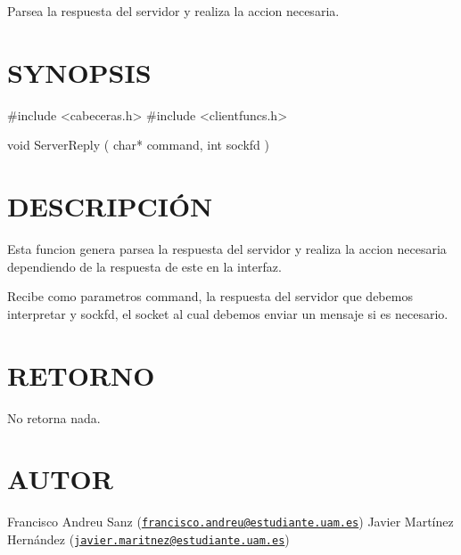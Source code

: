 Parsea la respuesta del servidor y realiza la accion necesaria.\hypertarget{ServerReply_SYNOPSIS}{}\section{S\-Y\-N\-O\-P\-S\-I\-S}\label{ServerReply_SYNOPSIS}
\begin{DoxyVerb} #include  <cabeceras.h>
   #include  <clientfuncs.h>

 void ServerReply ( char* command, int  sockfd  )
\end{DoxyVerb}
\hypertarget{ServerReply_descripcion}{}\section{D\-E\-S\-C\-R\-I\-P\-C\-IÓ\-N}\label{ServerReply_descripcion}
Esta funcion genera parsea la respuesta del servidor y realiza la accion necesaria dependiendo de la respuesta de este en la interfaz.

Recibe como parametros command, la respuesta del servidor que debemos interpretar y sockfd, el socket al cual debemos enviar un mensaje si es necesario.\hypertarget{ServerReply_retorno}{}\section{R\-E\-T\-O\-R\-N\-O}\label{ServerReply_retorno}
No retorna nada.\hypertarget{ServerReply_authors}{}\section{A\-U\-T\-O\-R}\label{ServerReply_authors}
Francisco Andreu Sanz (\href{mailto:francisco.andreu@estudiante.uam.es}{\tt francisco.\-andreu@estudiante.\-uam.\-es}) Javier Martínez Hernández (\href{mailto:javier.maritnez@estudiante.uam.es}{\tt javier.\-maritnez@estudiante.\-uam.\-es}) 

 